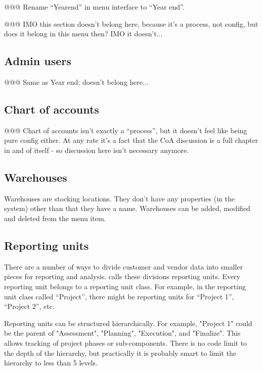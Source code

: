 @@@ Rename ``Yearend'' in menu interface to ``Year end''.


@@@ IMO this section doesn't belong here, because it's a process, not config, but does it belong in this menu then? IMO it doesn't...


\subsection{Admin users}
\label{subsec-company-config-admin-users}

@@@ Same as Year end; doesn't belong here...

\subsection{Chart of accounts}
\label{subsec-company-config-coa}

@@@ Chart of accounts isn't exactly a ``process'', but it doesn't feel like being pure
config either. At any rate it's a fact that the CoA discussion is a full chapter in and
of itself - so discussion here isn't necessary anymore.

\subsection{Warehouses}
\label{subsec-company-config-warehouses}

Warehouses are stocking locations. They don't have any properties (in the system)
other than that they have a name. Warehouses can be added, modified and deleted from
the  menu item.

\subsection{Reporting units}
\label{subsec-company-config-reporting-units}

There are a number of ways to divide customer and vendor data into smaller pieces for reporting and analysis. \lsmbsp calls these divisions \gls{reporting units}.  Every reporting unit belongs to a reporting unit class.
For example, in the reporting unit class called ``Project'', there might be reporting units for ``Project 1'', ``Project 2'', etc.

Reporting units can be structured hierarchically. 
For example, "Project 1" could be the parent of "Assessment", "Planning", "Execution", and "Finalize".  This allows tracking of project phases or sub-components. There is no code limit to the depth of the hierarchy, but practically it is probably smart to limit the hierarchy to less than 5 levels.


